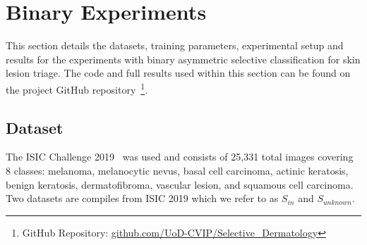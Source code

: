 \section{Binary Experiments}
\label{sec:selective_binary_experiment}
This section details the datasets, training parameters, experimental setup and results for the experiments with binary asymmetric selective classification for skin lesion triage. The code and full results used within this section can be found on the project GitHub repository~\footnote{GitHub Repository: \url{github.com/UoD-CVIP/Selective_Dermatology}}.

\subsection{Dataset}
The ISIC Challenge 2019~\citep{codella2018skin,combalia2019bcn20000,tschandl2018ham10000} was used and consists of 25,331 total images covering 8 classes: melanoma, melanocytic nevus, basal cell carcinoma, actinic keratosis, benign keratosis, dermatofibroma, vascular lesion, and squamous cell carcinoma. Two datasets are compiles from ISIC 2019 which we refer to as \(S_{in}\) and \(S_{unknown}\). 

